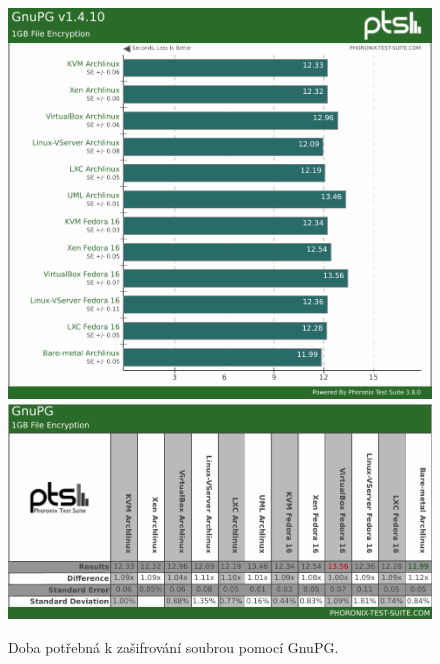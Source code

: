 \begin{figure}[h!]
  \centering
  \includegraphics[width=15cm]{obr/bench/gnupg-graph}
  \includegraphics[width=15cm]{obr/bench/gnupg-table}
  \caption{Doba potřebná k zašifrování soubrou pomocí GnuPG.}
  \label{obr:bench:gnupg}
\end{figure}



